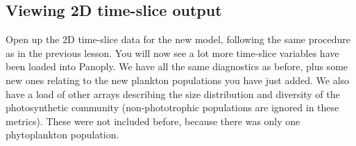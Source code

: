 \documentclass[11pt,fleqn]{book} %
\begin{document}

\subsection{Viewing 2D time-slice output} 

Open up the 2D time-slice data for the new model, following the same procedure as in the previous lesson. You will now see a lot more time-slice variables have been loaded into Panoply. We have all the same diagnostics as before, plus some new ones relating to the new plankton populations you have just added. We also have a load of other arrays describing the size distribution and diversity of the photosynthetic community (non-phototrophic populations are ignored in these metrics). These were not included before, because there was only one phytoplankton population.
\end{document}
